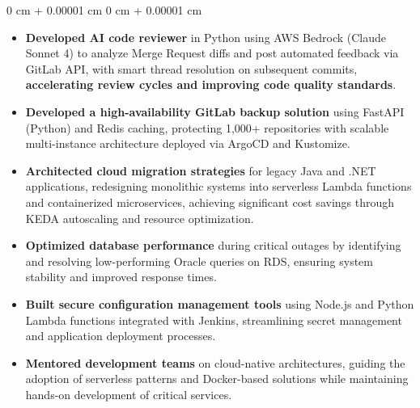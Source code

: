 \documentclass[11pt, letterpaper]{article}
\newenvironment{highlights}{
\begin{itemize}[
topsep=0.10 cm,
parsep=0.10 cm,
partopsep=0pt,
itemsep=0pt,
leftmargin=0 cm + 20pt
]
}{
\end{itemize}
} %
\newenvironment{onecolentry}{
\begin{adjustwidth}{
0 cm + 0.00001 cm
}{
0 cm + 0.00001 cm
}
}{
\end{adjustwidth}
} %
\begin{document}
\vspace{0.10 cm}
\begin{onecolentry}
\begin{highlights}
\item  \textbf{Developed AI code reviewer} in Python using AWS Bedrock (Claude Sonnet 4) to analyze Merge Request diffs and post automated feedback via GitLab API, with smart thread resolution on subsequent commits, \textbf{ accelerating review cycles and improving code quality standards}.
\vspace{0.05 cm}

\item \textbf{Developed a high-availability GitLab backup solution} using FastAPI (Python) and Redis caching, protecting 1,000+ repositories with scalable multi-instance architecture deployed via ArgoCD and Kustomize.
\vspace{0.05 cm}

\item \textbf{Architected cloud migration strategies} for legacy Java and .NET applications, redesigning monolithic systems into serverless Lambda functions and containerized microservices, achieving significant cost savings through KEDA autoscaling and resource optimization.
\vspace{0.05 cm}

\item \textbf{Optimized database performance} during critical outages by identifying and resolving low-performing Oracle queries on RDS, ensuring system stability and improved response times.
\vspace{0.05 cm}

\item \textbf{Built secure configuration management tools} using Node.js and Python Lambda functions integrated with Jenkins, streamlining secret management and application deployment processes.
\vspace{0.05 cm}


\item \textbf{Mentored development teams} on cloud-native architectures, guiding the adoption of serverless patterns and Docker-based solutions while maintaining hands-on development of critical services.
\end{highlights}
\end{onecolentry}
\end{document}

